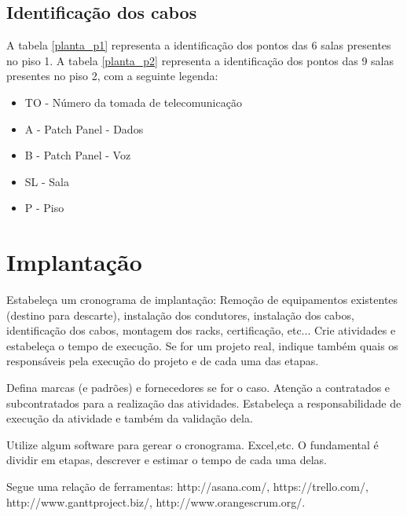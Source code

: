 \documentclass[	DIV=calc,%
							paper=a4,%
							fontsize=12pt,%
							onecolumn]{scrartcl}	 					%
\begin{document}

\FloatBarrier
\subsection{Identificação dos cabos}
A tabela \ref{planta_p1} representa a identificação dos pontos das 6 salas presentes no piso 1.
A tabela \ref{planta_p2} representa a identificação dos pontos das 9 salas presentes no piso 2, com a seguinte legenda:
\begin{itemize}
	\item TO - Número da tomada de telecomunicação
	\item A  - Patch Panel - Dados
	\item B  - Patch Panel - Voz
	\item SL - Sala 
	\item P  - Piso
\end{itemize}


\FloatBarrier

\FloatBarrier
\section{Implantação}
Estabeleça um cronograma de implantação:
Remoção de equipamentos existentes (destino para descarte), instalação dos condutores, instalação dos cabos, 
identificação dos cabos, montagem dos racks, certificação, etc... Crie atividades e estabeleça o tempo de execução. Se for um projeto real, indique também quais os responsáveis pela execução do projeto e de cada uma das etapas.

Defina marcas (e padrões) e fornecedores se for o caso. Atenção a contratados e subcontratados para a realização das atividades. Estabeleça a responsabilidade de execução da atividade e também da validação dela.

Utilize algum software para gerear o cronograma. Excel,etc. O fundamental é dividir em etapas, descrever e estimar o tempo de cada uma delas.

Segue uma relação de ferramentas:
http://asana.com/, 
https://trello.com/, 
http://www.ganttproject.biz/, 
http://www.orangescrum.org/. 
\end{document}
